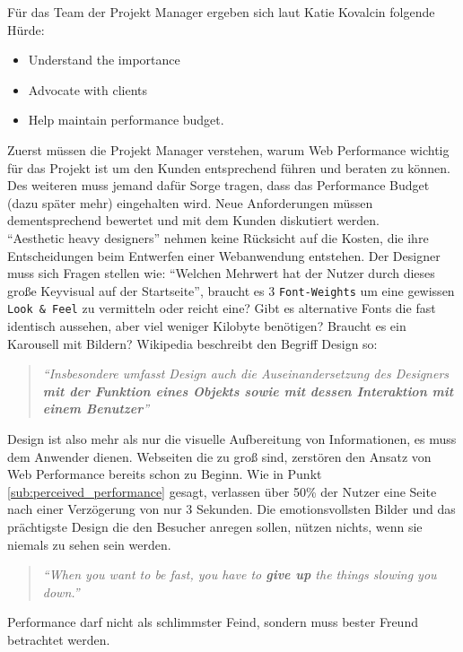 	Für das Team der Projekt Manager ergeben sich laut Katie Kovalcin folgende Hürde: \autocite[p. 43]{kovalcin15}\\
	\begin{itemize}
		\item Understand the importance
		\item Advocate with clients
		\item Help maintain performance budget.
	\end{itemize}

	Zuerst müssen die Projekt Manager verstehen, warum Web Performance wichtig für das Projekt ist um den Kunden entsprechend führen und beraten zu können. Des weiteren muss jemand dafür Sorge tragen, dass das Performance Budget (dazu später mehr) eingehalten wird. Neue Anforderungen müssen dementsprechend bewertet und mit dem Kunden diskutiert werden.\\

	"`Aesthetic heavy designers"' nehmen keine Rücksicht auf die Kosten, die ihre Entscheidungen beim Entwerfen einer Webanwendung entstehen. Der Designer muss sich Fragen stellen wie: "`Welchen Mehrwert hat der Nutzer durch dieses große Keyvisual auf der Startseite"', braucht es 3 \texttt{Font-Weights} um eine gewissen \texttt{Look \& Feel} zu vermitteln oder reicht eine? Gibt es alternative Fonts die fast identisch aussehen, aber viel weniger Kilobyte benötigen? Braucht es ein Karousell mit Bildern?
	Wikipedia beschreibt den Begriff Design so:
	\begin{quote}
		\textit{"`Insbesondere umfasst Design auch die Auseinandersetzung des Designers \textbf{mit der Funktion eines Objekts sowie mit dessen Interaktion mit einem Benutzer}"'} \autocite{wikipediaDesign}
	\end{quote}
	Design ist also mehr als nur die visuelle Aufbereitung von Informationen, es muss dem Anwender dienen. Webseiten die zu groß sind, zerstören den Ansatz von Web Performance bereits schon zu Beginn. Wie in Punkt \ref{sub:perceived_performance} gesagt, verlassen über 50\% der Nutzer eine Seite nach einer Verzögerung von nur 3 Sekunden. Die emotionsvollsten Bilder und das prächtigste Design die den Besucher anregen sollen, nützen nichts, wenn sie niemals zu sehen sein werden.

	\begin{quote}
		\textit{"`When you want to be fast, you have to \textbf{give up} the things slowing you down."'}\autocite[p. 2]{osmani14}
	\end{quote}

	Performance darf nicht als schlimmster Feind, sondern muss bester Freund betrachtet werden.




\pagebreak
